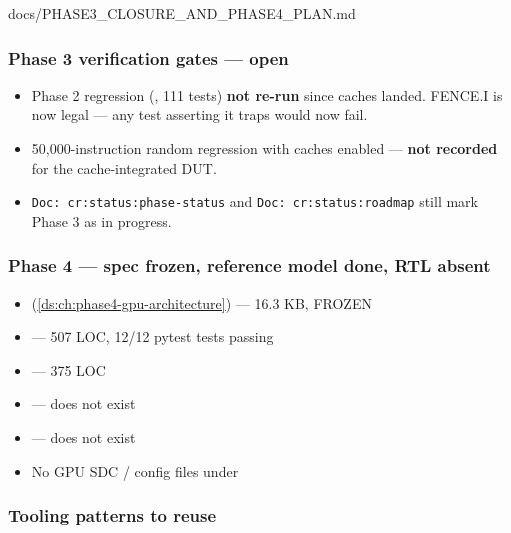 \begin{relocated}{docs/PHASE3_CLOSURE_AND_PHASE4_PLAN.md}
\subsubsection{Phase 3 verification gates --- open}\label{ds:ch:phase3-closure-phase4-plan:phase-3-verification-gates-open}

\begin{itemize}
\tightlist
\item
  Phase 2 regression (, 111 tests) \textbf{not
  re-run} since caches landed. FENCE.I is now legal --- any test
  asserting it traps would now fail.
\item
  50,000-instruction random regression with caches enabled ---
  \textbf{not recorded} for the cache-integrated DUT.
\item
  \texttt{Doc:\allowbreak{}\ cr:\allowbreak{}status:\allowbreak{}phase-\allowbreak{}status}
  and
  \texttt{Doc:\allowbreak{}\ cr:\allowbreak{}status:\allowbreak{}roadmap}
  still mark Phase 3 as in progress.
\end{itemize}

\subsubsection{Phase 4 --- spec frozen, reference model done, RTL
absent}\label{ds:ch:phase3-closure-phase4-plan:phase-4-spec-frozen-reference-model-done-rtl-absent}

\begin{itemize}
\tightlist
\item
   (\cref{ds:ch:phase4-gpu-architecture}) --- 16.3 KB, FROZEN
\item
   --- 507 LOC, 12/12 pytest tests
  passing
\item
   --- 375 LOC
\item
   --- does not exist
\item
   --- does not exist
\item
  No GPU SDC / config files under 
\end{itemize}

\subsubsection{Tooling patterns to reuse}\label{ds:ch:phase3-closure-phase4-plan:tooling-patterns-to-reuse}


\end{relocated}
